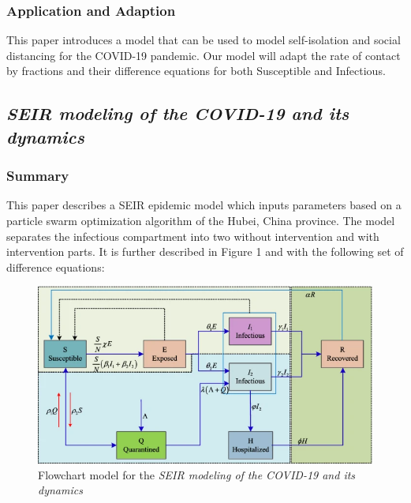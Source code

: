\documentclass{article}
\begin{document}
\subsubsection{Application and Adaption}
This paper introduces a model that can be used to model self-isolation and social distancing for the COVID-19 pandemic. Our model will adapt the rate of contact by fractions and their difference equations for both Susceptible and Infectious.

\subsection{\textit{SEIR modeling of the COVID-19 and its dynamics}}
\subsubsection{Summary}
This paper describes a SEIR epidemic model which inputs parameters based on a particle swarm optimization algorithm of the Hubei, China province. The model separates the infectious compartment into two without intervention and with intervention parts. It is further described in Figure 1 and with the following set of difference equations:

\begin{figure}
\includegraphics[scale=0.5]{dynamicmodel.png}
\caption{Flowchart model for the \textit{SEIR modeling of the COVID-19 and its dynamics}}
\end{figure}
\end{document}
